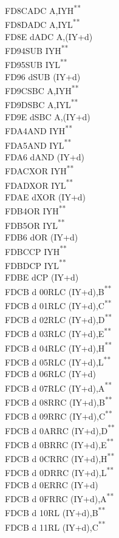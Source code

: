 \documentclass[12pt,twoside,openright,a4paper]{book}
\newcommand{\UNDOC}{\textnormal{\textsuperscript{**}}}
\begin{document}
\begin{multicols}{3}
{\begin{tabbing}
	FD8C\>ADC A,IYH\UNDOC\\
	FD8D\>ADC A,IYL\UNDOC\\
	FD8E d\>ADC A,(IY+d)\\
	FD94\>SUB IYH\UNDOC\\
	FD95\>SUB IYL\UNDOC\\
	FD96 d\>SUB (IY+d)\\
	FD9C\>SBC A,IYH\UNDOC\\
	FD9D\>SBC A,IYL\UNDOC\\
	FD9E d\>SBC A,(IY+d)\\
	FDA4\>AND IYH\UNDOC\\
	FDA5\>AND IYL\UNDOC\\
	FDA6 d\>AND (IY+d)\\
	FDAC\>XOR IYH\UNDOC\\
	FDAD\>XOR IYL\UNDOC\\
	FDAE d\>XOR (IY+d)\\
	FDB4\>OR IYH\UNDOC\\
	FDB5\>OR IYL\UNDOC\\
	FDB6 d\>OR (IY+d)\\
	FDBC\>CP IYH\UNDOC\\
	FDBD\>CP IYL\UNDOC\\
	FDBE d\>CP (IY+d)\\
	FDCB d 00\>RLC (IY+d),B\UNDOC\\
	FDCB d 01\>RLC (IY+d),C\UNDOC\\
	FDCB d 02\>RLC (IY+d),D\UNDOC\\
	FDCB d 03\>RLC (IY+d),E\UNDOC\\
	FDCB d 04\>RLC (IY+d),H\UNDOC\\
	FDCB d 05\>RLC (IY+d),L\UNDOC\\
	FDCB d 06\>RLC (IY+d)\\
	FDCB d 07\>RLC (IY+d),A\UNDOC\\
	FDCB d 08\>RRC (IY+d),B\UNDOC\\
	FDCB d 09\>RRC (IY+d),C\UNDOC\\
	FDCB d 0A\>RRC (IY+d),D\UNDOC\\
	FDCB d 0B\>RRC (IY+d),E\UNDOC\\
	FDCB d 0C\>RRC (IY+d),H\UNDOC\\
	FDCB d 0D\>RRC (IY+d),L\UNDOC\\
	FDCB d 0E\>RRC (IY+d)\\
	FDCB d 0F\>RRC (IY+d),A\UNDOC\\
	FDCB d 10\>RL (IY+d),B\UNDOC\\
	FDCB d 11\>RL (IY+d),C\UNDOC\\

\end{tabbing}}
\end{multicols}
\end{document}
